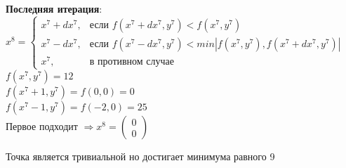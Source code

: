 \textbf{Последняя итерация}:\\
$
x^{8} = 
\begin{cases}
x^{7} + dx^{7},&\text{если $f(x^{7} + dx^{7}, y^{7}) < f(x^{7}, y^{7})$}\\
x^{7} - dx^{7},&\text{если $f(x^{7} - dx^{7}, y^{7}) < min|f(x^{7}, y^{7}), f(x^{7} + dx^{7}, y^{7})|$}\\
x^{7},&\text{в противном случае}
\end{cases}
$\\
$f(x^{7}, y^{7}) = 12$\\
$f(x^{7} + 1, y^{7}) = f(0, 0) = 0 $\\
$f(x^{7} - 1, y^{7}) = f(-2, 0) = 25 $\\
Первое подходит $\Rightarrow x^{8} = 
\begin{pmatrix}
  0\\
  0
\end{pmatrix}
$

Точка является тривиальной но достигает минимума равного 9
\pagebreak
